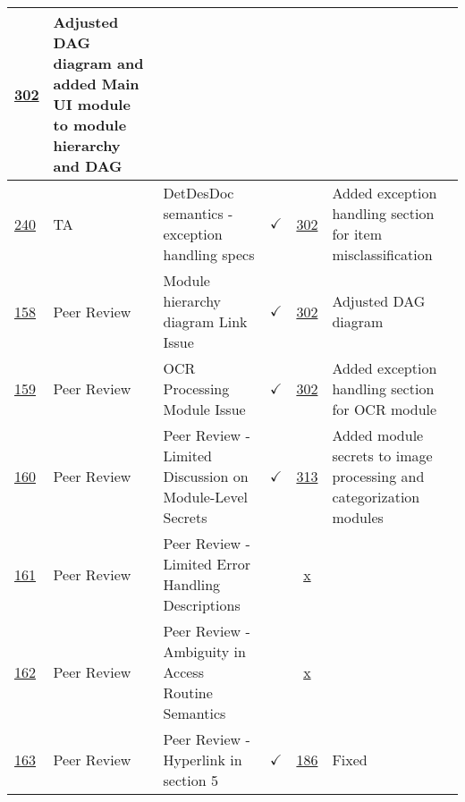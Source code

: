 \documentclass{article}
\begin{document}
\begin{table}[H]
{\begin{tabular}{p{1.5cm} p{2cm} p{3.5cm} c c p{4cm}}
        \href{https://github.com/PlutosCapstone/Plutos/pull/302}{302} &  Adjusted
        DAG diagram and added Main UI module to module hierarchy and DAG \\ \hline
        \href{https://github.com/PlutosCapstone/Plutos/issues/240}{240} & TA  &
        DetDesDoc semantics - exception handling specs & $\checkmark$ &
        \href{https://github.com/PlutosCapstone/Plutos/pull/302}{302} &  Added
        exception handling section for item misclassification \\ \hline
        \href{https://github.com/PlutosCapstone/Plutos/issues/158}{158} & Peer Review &
        Module hierarchy diagram Link Issue & $\checkmark$ &
        \href{https://github.com/PlutosCapstone/Plutos/pull/302}{302} &  Adjusted
        DAG diagram \\ \hline
        \href{https://github.com/PlutosCapstone/Plutos/issues/159}{159} & Peer Review &
        OCR Processing Module Issue & $\checkmark$ &
        \href{https://github.com/PlutosCapstone/Plutos/pull/302}{302} &  Added
        exception handling section for OCR module \\ \hline
        \href{https://github.com/PlutosCapstone/Plutos/issues/160}{160} & Peer
        Review & Peer Review - Limited Discussion on Module-Level Secrets &
        $\checkmark$ &
        \href{https://github.com/PlutosCapstone/Plutos/pull/313}{313} & Added
        module secrets to image processing and categorization modules  \\ \hline
        \href{https://github.com/PlutosCapstone/Plutos/issues/161}{161} & Peer
        Review & Peer Review - Limited Error Handling Descriptions &  &
        \href{https://github.com/PlutosCapstone/Plutos/pull/x}{x} &   \\ \hline
        \href{https://github.com/PlutosCapstone/Plutos/issues/162}{162} & Peer
        Review & Peer Review - Ambiguity in Access Routine Semantics  &  &
        \href{https://github.com/PlutosCapstone/Plutos/pull/x}{x} &   \\ \hline
        \href{https://github.com/PlutosCapstone/Plutos/issues/163}{163} & Peer
        Review & Peer Review - Hyperlink in section 5 & $\checkmark$ &
        \href{https://github.com/PlutosCapstone/Plutos/pull/186}{186} & Fixed
        \\
    \bottomrule
    \end{tabular}%
    }
\end{table}
\end{document}
